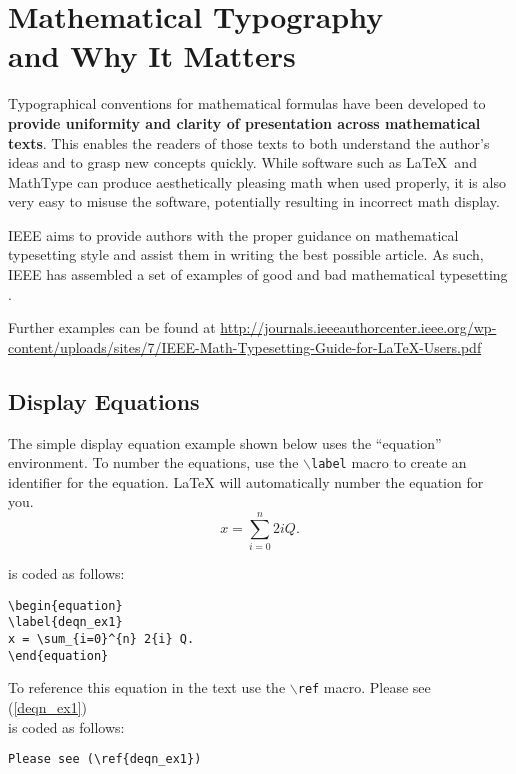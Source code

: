 \documentclass[lettersize,journal]{IEEEtran}
\begin{document}
\section{Mathematical Typography \\ and Why It Matters}

Typographical conventions for mathematical formulas have been developed to {\bf provide uniformity and clarity of presentation across mathematical texts}. This enables the readers of those texts to both understand the author's ideas and to grasp new concepts quickly. While software such as \LaTeX \ and MathType\textsuperscript{\textregistered} can produce aesthetically pleasing math when used properly, it is also very easy to misuse the software, potentially resulting in incorrect math display.

IEEE aims to provide authors with the proper guidance on mathematical typesetting style and assist them in writing the best possible article. As such, IEEE has assembled a set of examples of good and bad mathematical typesetting \cite{ref1,ref2,ref3,ref4,ref5}. 

Further examples can be found at \url{http://journals.ieeeauthorcenter.ieee.org/wp-content/uploads/sites/7/IEEE-Math-Typesetting-Guide-for-LaTeX-Users.pdf}

\subsection{Display Equations}
The simple display equation example shown below uses the ``equation'' environment. To number the equations, use the $\backslash${\tt{label}} macro to create an identifier for the equation. LaTeX will automatically number the equation for you.
\begin{equation}
\label{deqn_ex1}
x = \sum_{i=0}^{n} 2{i} Q.
\end{equation}

\noindent is coded as follows:
\begin{verbatim}
\begin{equation}
\label{deqn_ex1}
x = \sum_{i=0}^{n} 2{i} Q.
\end{equation}
\end{verbatim}

To reference this equation in the text use the $\backslash${\tt{ref}} macro. 
Please see (\ref{deqn_ex1})\\
\noindent is coded as follows:
\begin{verbatim}
Please see (\ref{deqn_ex1})\end{verbatim}
\end{document}

